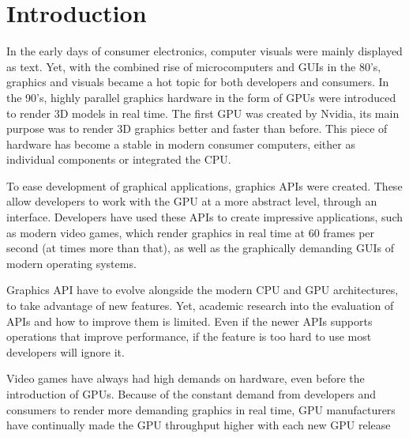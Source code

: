 \chapter{Introduction}\label{ch:introduction}
In the early days of consumer electronics, computer visuals were mainly displayed as text.
Yet, with the combined rise of microcomputers and \glspl{GUI} in the 80's, graphics and visuals became a hot topic for both developers and consumers.  
In the 90's, highly parallel graphics hardware in the form of GPUs were introduced to render 3D models in real time.
The first GPU was created by Nvidia, its main purpose was to render 3D graphics better and faster than before. \cite{NvidiaFirstGPU}
This piece of hardware has become a stable in modern consumer computers, either as individual components or integrated the CPU.

To ease development of graphical applications, graphics \glspl{API} were created. 
These allow developers to work with the GPU at a more abstract level, through an interface.
Developers have used these \glspl{API} to create impressive applications, such as modern video games, which render graphics in real time at 60 frames per second (at times more than that), as well as the graphically demanding \glspl{GUI} of modern operating systems.

Graphics \gls{API} have to evolve alongside the modern CPU and GPU architectures, to take advantage of new features. 
Yet, academic research into the evaluation of \glspl{API} and how to improve them is limited.
Even if the newer \glspl{API} supports operations that improve performance, if the feature is too hard to use most developers will ignore it.

Video games have always had high demands on hardware, even before the introduction of \glspl{GPU}.
Because of the constant demand from developers and consumers to render more demanding graphics in real time, \gls{GPU} manufacturers have continually made the GPU throughput higher with each new \gls{GPU} release

